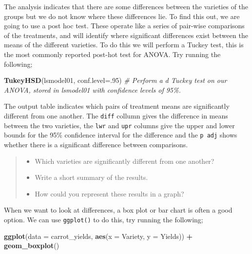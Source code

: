 \documentclass[
]{book}
\newenvironment{Shaded}{\begin{snugshade}}{\end{snugshade}}
\newcommand{\AttributeTok}[1]{\textcolor[rgb]{0.13,0.29,0.53}{#1}}
\newcommand{\CommentTok}[1]{\textcolor[rgb]{0.56,0.35,0.01}{\textit{#1}}}
\newcommand{\DecValTok}[1]{\textcolor[rgb]{0.00,0.00,0.81}{#1}}
\newcommand{\FunctionTok}[1]{\textcolor[rgb]{0.13,0.29,0.53}{\textbf{#1}}}
\newcommand{\NormalTok}[1]{#1}
\newcommand{\SpecialCharTok}[1]{\textcolor[rgb]{0.81,0.36,0.00}{\textbf{#1}}}
\providecommand{\tightlist}{%
  \setlength{\itemsep}{0pt}\setlength{\parskip}{0pt}}
\begin{document}
The analysis indicates that there are some differences between the varieties of the groups but we do not know where these differences lie. To find this out, we are going to use a post hoc test. These operate like a series of pair-wise comparisons of the treatments, and will identify where significant differences exist between the means of the different varieties. To do this we will perform a Tuckey test, this is the most commonly reported post-hot test for ANOVA. Try running the following;

\begin{Shaded}
\begin{Highlighting}[]
\FunctionTok{TukeyHSD}\NormalTok{(lsmodel01, }\AttributeTok{conf.level=}\NormalTok{.}\DecValTok{95}\NormalTok{) }
\CommentTok{\# Perform a d Tuckey test on our ANOVA, stored in lsmodel01 with confidence levels of 95\%.}
\end{Highlighting}
\end{Shaded}

The output table indicates which pairs of treatment means are significantly different from one another. The \texttt{diff} collumn gives the difference in means between the two varieties, the \texttt{lwr} and \texttt{upr} columns give the upper and lower bounds for the 95\% confidence interval for the difference and the \texttt{p\ adj} shows whether there is a significant difference between comparisons.

\begin{quote}
\begin{itemize}
\tightlist
\item
  Which varieties are significantly different from one another?
\item
  Write a short summary of the results.
\item
  How could you represent these results in a graph?
\end{itemize}
\end{quote}

When we want to look at differences, a box plot or bar chart is often a good option. We can use \texttt{ggplot()} to do this, try running the following;

\begin{Shaded}
\begin{Highlighting}[]
\FunctionTok{ggplot}\NormalTok{(}\AttributeTok{data =}\NormalTok{ carrot\_yields, }\FunctionTok{aes}\NormalTok{(}\AttributeTok{x =}\NormalTok{ Variety, }\AttributeTok{y =}\NormalTok{ Yields)) }\SpecialCharTok{+}
  \FunctionTok{geom\_boxplot}\NormalTok{()}
\end{Highlighting}
\end{Shaded}
\end{document}
